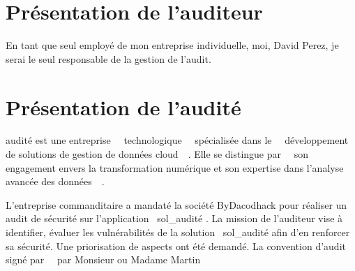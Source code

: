\documentclass[12pt]{extarticle}
\begin{document}
\section{Présentation de l'auditeur}
En tant que seul employé de mon entreprise individuelle, moi, David Perez, je serai le seul responsable de la gestion de l'audit.

\section{Présentation de l'audité}
{{audité }} est une entreprise ~~technologique~~ spécialisée dans le ~~développement de solutions de gestion de données cloud~~. Elle se distingue par ~~son engagement envers la transformation numérique et son expertise dans l'analyse avancée des données~~.

L’entreprise {{ commanditaire }} a mandaté la société ByDacodhack pour réaliser un audit de sécurité sur l’application {{ sol_audité }}. 
La mission de l'auditeur vise à identifier, évaluer les vulnérabilités de la solution {{ sol_audité }} afin d'en renforcer sa sécurité. Une priorisation de {{ aspects }} ont été demandé.
La convention d'audit signé par ~~par Monsieur ou Madame Martin~~ 
\end{document}
